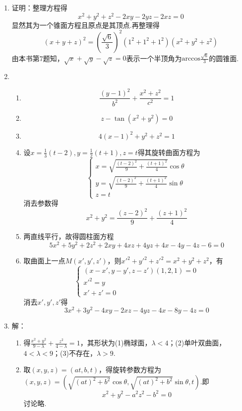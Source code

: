 \documentclass[UTF8]{ctexart}
\begin{document}
\begin{enumerate}
\item 证明：整理方程得$$x^2+y^2+z^2-2xy-2yz-2xz=0$$显然其为一个锥面方程且原点是其顶点.再整理得$$\left(x+y+z\right)^2=\left(\frac{\sqrt{6}}{3}\right)^2\left(1^2+1^2+1^2\right)\left(x^2+y^2+z^2\right)$$由本书第7题知，$\sqrt{x}+\sqrt{y}-\sqrt{z}=0$表示一个半顶角为$\mathrm{arccos}\displaystyle\frac{\sqrt{6}}{3}$的圆锥面. 

\item \begin{enumerate}[(1)]
\item $$\frac{\left(y-1\right)^2}{b^2}+\frac{x^2+z^2}{c^2}=1$$
\item $$z-\tan\left(x^2+y^2\right)=0$$
\item $$4\left(x-1\right)^2+y^2+z^2=1$$
\item 设$x=\displaystyle\frac{1}{3}\left(t-2\right),y=\displaystyle\frac{1}{2}\left(t+1\right),z=t$得其旋转曲面方程为$$\left\{\begin{array}{l}x=\sqrt{\displaystyle\frac{\left(t-2\right)^2}{9}+\displaystyle\frac{\left(t+1\right)^2}{4}}\cos\theta\\y=\sqrt{\displaystyle\frac{\left(t-2\right)^2}{9}+\displaystyle\frac{\left(t+1\right)^2}{4}}\sin\theta\\z=t\end{array}\right.$$消去参数得$$x^2+y^2=\displaystyle\frac{\left(z-2\right)^2}{9}+\displaystyle\frac{\left(z+1\right)^2}{4}$$
\item 两直线平行，故得圆柱面方程$$5x^2+5y^2+2z^2+2xy+4xz+4yz+4x-4y-4z-6=0$$
\item 取曲面上一点$M\left(x',y',z'\right)$，则$x'^2+y'^2+z'^2=x^2+y^2+z^2$，有$$\left\{\begin{array}{l}\left(x-x',y-y',z-z'\right)\left(1,2,1\right)=0\\x'^2=y\\x'+z'=0\end{array}\right.$$消去$x',y',z'$得$$3x^2+3y^2-4xy-2xz-4yz-4x-8y-4z=0$$
\end{enumerate}

\item 解：\begin{enumerate}[(1)]
\item 得$\displaystyle\frac{x^2+y^2}{9-\lambda}+\displaystyle\frac{z^2}{4-\lambda}=1$，其形状为(1)椭球面，$\lambda<4$；(2)单叶双曲面，$4<\lambda<9$；(3)不存在，$\lambda>9$.
\item 取$\left(x,y,z\right)=\left(at,b,t\right)$，得旋转参数方程为$\left(x,y,z\right)=\left(\sqrt{\left(at\right)^2+b^2}\cos\theta,\sqrt{\left(at\right)^2+b^2}\sin\theta,t\right).$即$$x^2+y^2-a^2z^2-b^2=0$$讨论略.
\end{enumerate}


\end{enumerate}
\end{document}
